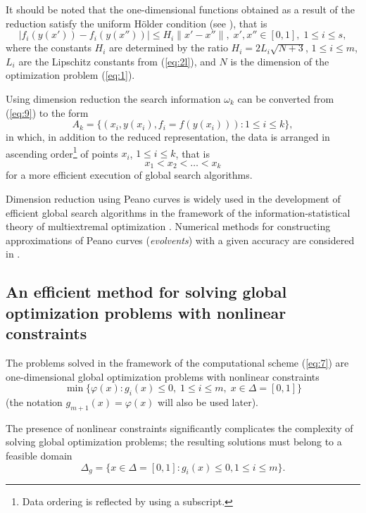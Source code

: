 \documentclass[smallextended]{svjour3}       %
\begin{document}
It should be noted that the one-dimensional functions obtained as a result of the reduction satisfy the uniform H\"older condition (see \cite{c17,c18}), that is
\begin{equation}\label{eq:11}
|f_i (y(x'))-f_i (y(x''))| \leq H_i \|x'-x''\|, \; x',x''\in [0,1],\; 1 \leq i \leq s,
\end{equation}
where the constants $H_i$ are determined by the ratio $H_i=2L_i\sqrt{N+3}$, $1 \leq i \leq m$, $L_i$ are the Lipschitz constants from (\ref{eq:2l}), and $N$ is the dimension of the optimization problem (\ref{eq:1}).

Using dimension reduction the search information $\omega_k$ can be converted from (\ref{eq:9}) to the form
\begin{equation}\label{eq:12}
A_k=\{(x_i, y(x_i), f_i=f(y(x_i))): 1 \leq i \leq k \},
\end{equation}
in which, in addition to the reduced representation, the data is arranged in ascending order\footnote{Data ordering is reflected by using a subscript.} of points $x_i$, $1 \leq i \leq k$, that is
\begin{equation}
x_1 < x_2 < \dots < x_k	
\end{equation}
for a more efficient execution of global search algorithms.

Dimension reduction using Peano curves is widely used in the development of efficient global search algorithms in the framework of the information-statistical theory of multiextremal optimization \cite{c17,c18,c23,c26,c27}. Numerical methods for constructing approximations of Peano curves (\textit{evolvents}) with a given accuracy are considered in \cite{c17,c18}.

\subsection{An efficient method for solving global optimization problems with 
nonlinear constraints}

The problems solved in the framework of the computational scheme (\ref{eq:7}) are one-dimensional global optimization problems with nonlinear constraints
\begin{equation}\label{eq:13}
\min{\{\varphi(x):g_i(x)\leq 0, \; 1 \leq i \leq m,\; x\in \Delta=[0,1]\}}
\end{equation}
(the notation $g_{m+1}(x) = \varphi(x)$ will also be used later).

The presence of nonlinear constraints significantly complicates the complexity of solving global optimization problems; the resulting solutions must belong to a feasible domain
\begin{equation}\label{eq:14}
\Delta_g  = \{ x\in \Delta=[0,1]:g_i(x)\leq 0,   1 \leq i \leq m \}.
\end{equation}
\end{document}
